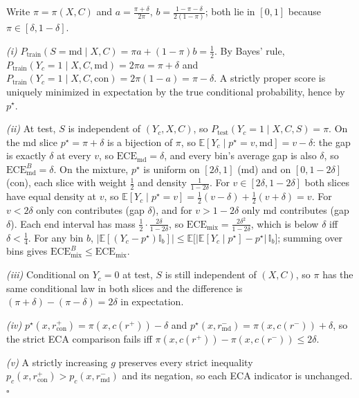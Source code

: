 \documentclass[letterpaper]{article} %
\begin{document}
Write $\pi=\pi(X,C)$ and $a=\frac{\pi+\delta}{2\pi}$, $b=\frac{1-\pi-\delta}{2(1-\pi)}$; both lie in $[0,1]$ because $\pi\in[\delta,1-\delta]$.

\emph{(i)} $P_{\mathrm{train}}(S{=}\mathrm{md}\mid X,C)=\pi a+(1-\pi)b=\tfrac12$. By Bayes' rule, $P_{\mathrm{train}}(Y_c{=}1\mid X,C,\mathrm{md})=2\pi a=\pi+\delta$ and $P_{\mathrm{train}}(Y_c{=}1\mid X,C,\mathrm{con})=2\pi(1-a)=\pi-\delta$. A strictly proper score is uniquely minimized in expectation by the true conditional probability, hence by $p^\star$.

\emph{(ii)} At test, $S$ is independent of $(Y_c,X,C)$, so $P_{\mathrm{test}}(Y_c{=}1\mid X,C,S)=\pi$. On the md slice $p^\star=\pi+\delta$ is a bijection of $\pi$, so $\mathbb{E}[Y_c\mid p^\star{=}v,\mathrm{md}]=v-\delta$: the gap is exactly $\delta$ at every $v$, so $\mathrm{ECE}_{\mathrm{md}}=\delta$, and every bin's average gap is also $\delta$, so $\mathrm{ECE}^B_{\mathrm{md}}=\delta$. On the mixture, $p^\star$ is uniform on $[2\delta,1]$ (md) and on $[0,1-2\delta]$ (con), each slice with weight $\tfrac12$ and density $\frac{1}{1-2\delta}$. For $v\in[2\delta,1-2\delta]$ both slices have equal density at $v$, so $\mathbb{E}[Y_c\mid p^\star{=}v]=\tfrac12(v-\delta)+\tfrac12(v+\delta)=v$. For $v<2\delta$ only con contributes (gap $\delta$), and for $v>1-2\delta$ only md contributes (gap $\delta$). Each end interval has mass $\tfrac12\cdot\frac{2\delta}{1-2\delta}$, so $\mathrm{ECE}_{\mathrm{mix}}=\frac{2\delta^2}{1-2\delta}$, which is below $\delta$ iff $\delta<\tfrac14$. For any bin $b$, $\bigl|\mathbb{E}[(Y_c-p^\star)\mathbb{I}_b]\bigr|\le\mathbb{E}\bigl[|\mathbb{E}[Y_c\mid p^\star]-p^\star|\,\mathbb{I}_b\bigr]$; summing over bins gives $\mathrm{ECE}^B_{\mathrm{mix}}\le\mathrm{ECE}_{\mathrm{mix}}$.

\emph{(iii)} Conditional on $Y_c{=}0$ at test, $S$ is still independent of $(X,C)$, so $\pi$ has the same conditional law in both slices and the difference is $(\pi+\delta)-(\pi-\delta)=2\delta$ in expectation.

\emph{(iv)} $p^\star(x,r^+_{\mathrm{con}})=\pi(x,c(r^+))-\delta$ and $p^\star(x,r^-_{\mathrm{md}})=\pi(x,c(r^-))+\delta$, so the strict ECA comparison fails iff $\pi(x,c(r^+))-\pi(x,c(r^-))\le2\delta$.

\emph{(v)} A strictly increasing $g$ preserves every strict inequality $p_c(x,r^+_{\mathrm{con}})>p_c(x,r^-_{\mathrm{md}})$ and its negation, so each ECA indicator is unchanged. $\square$
\end{document}
